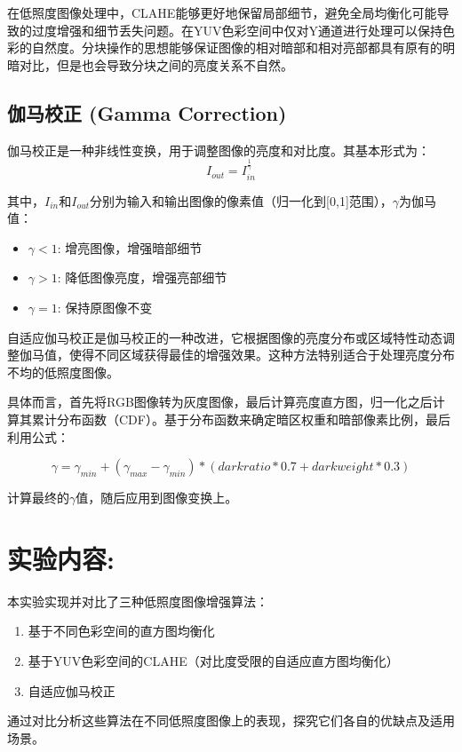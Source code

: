 \documentclass[a4paper,11pt,UTF8]{ctexart}
\begin{document}
在低照度图像处理中，CLAHE能够更好地保留局部细节，避免全局均衡化可能导致的过度增强和细节丢失问题。在YUV色彩空间中仅对Y通道进行处理可以保持色彩的自然度。分块操作的思想能够保证图像的相对暗部和相对亮部都具有原有的明暗对比，但是也会导致分块之间的亮度关系不自然。

\subsection{伽马校正 (Gamma Correction)}
伽马校正是一种非线性变换，用于调整图像的亮度和对比度。其基本形式为：
\begin{equation}
I_{out} = I_{in}^{\frac{1}{\gamma}}
\end{equation}

其中，$I_{in}$和$I_{out}$分别为输入和输出图像的像素值（归一化到[0,1]范围），$\gamma$为伽马值：
\begin{itemize}
    \item $\gamma < 1$: 增亮图像，增强暗部细节
    \item $\gamma > 1$: 降低图像亮度，增强亮部细节
    \item $\gamma = 1$: 保持原图像不变
\end{itemize}

自适应伽马校正是伽马校正的一种改进，它根据图像的亮度分布或区域特性动态调整伽马值，使得不同区域获得最佳的增强效果。这种方法特别适合于处理亮度分布不均的低照度图像。

具体而言，首先将RGB图像转为灰度图像，最后计算亮度直方图，归一化之后计算其累计分布函数（CDF）。基于分布函数来确定暗区权重和暗部像素比例，最后利用公式：

$$\gamma = \gamma_{min} + (\gamma_{max} - \gamma_{min}) * (darkratio * 0.7 + darkweight * 0.3)$$

计算最终的$\gamma$值，随后应用到图像变换上。

\section{实验内容:}
本实验实现并对比了三种低照度图像增强算法：
\begin{enumerate}
    \item 基于不同色彩空间的直方图均衡化
    \item 基于YUV色彩空间的CLAHE（对比度受限的自适应直方图均衡化）
    \item 自适应伽马校正
\end{enumerate}

通过对比分析这些算法在不同低照度图像上的表现，探究它们各自的优缺点及适用场景。
\end{document}
